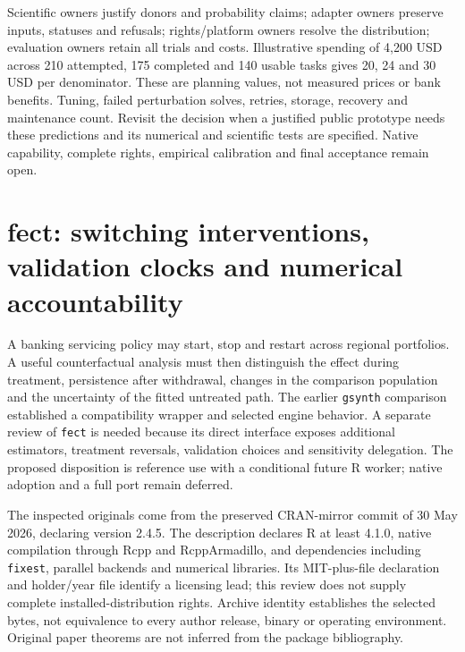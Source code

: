 Scientific owners justify donors and probability claims; adapter owners
preserve inputs, statuses and refusals; rights/platform owners resolve
the distribution; evaluation owners retain all trials and costs.
Illustrative spending of 4,200 USD across 210 attempted, 175 completed
and 140 usable tasks gives 20, 24 and 30 USD per denominator. These are
planning values, not measured prices or bank benefits. Tuning, failed
perturbation solves, retries, storage, recovery and maintenance count.
Revisit the decision when a justified public prototype needs these
predictions and its numerical and scientific tests are specified.
Native capability, complete rights, empirical calibration and final
acceptance remain open.~\citep{exec24_scpi_choice}


\section{fect: switching interventions, validation clocks and numerical accountability}
\label{sec:exec24-fect-reuse}

A banking servicing policy may start, stop and restart across regional
portfolios. A useful counterfactual analysis must then distinguish the effect
during treatment, persistence after withdrawal, changes in the comparison
population and the uncertainty of the fitted untreated path. The earlier
\texttt{gsynth} comparison established a compatibility wrapper and selected
engine behavior. A separate review of \texttt{fect} is needed because its
direct interface exposes additional estimators, treatment reversals,
validation choices and sensitivity delegation. The proposed disposition is
reference use with a conditional future R worker; native adoption and a full
port remain deferred.~\citep{exec21_gsynth_wrapper,exec21_gsynth_engine,exec24_fect_choice}

The inspected originals come from the preserved CRAN-mirror commit of
30 May 2026, declaring version 2.4.5. The description declares R at least
4.1.0, native compilation through Rcpp and RcppArmadillo, and dependencies
including \texttt{fixest}, parallel backends and numerical libraries.
Its MIT-plus-file declaration and holder/year file identify a licensing
lead; this review does not supply complete installed-distribution rights.
Archive identity establishes the selected bytes, not equivalence to every
author release, binary or operating environment. Original paper theorems
are not inferred from the package bibliography.~\citep{exec24_fect_source,v12_sw_fect}

